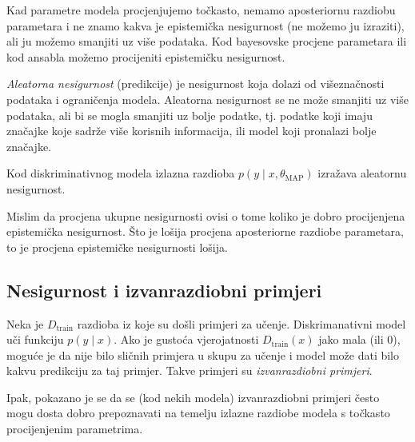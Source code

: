 \documentclass{article}
\begin{document}
Kad parametre modela procjenjujemo točkasto, nemamo aposteriornu razdiobu parametara i ne znamo kakva je epistemička nesigurnost (ne možemo ju izraziti), ali ju možemo smanjiti uz više podataka. Kod bayesovske procjene parametara ili kod ansabla možemo procijeniti epistemičku nesigurnost.

\emph{Aleatorna nesigurnost} (predikcije) je nesigurnost koja dolazi od višeznačnosti podataka i ograničenja modela. Aleatorna nesigurnost se ne može smanjiti uz više podataka, ali bi se mogla smanjiti uz bolje podatke, tj. podatke koji imaju značajke koje sadrže više korisnih informacija, ili model koji pronalazi bolje značajke.

Kod diskriminativnog modela izlazna razdioba $p(y\mid x, \theta_\text{MAP})$ izražava aleatornu nesigurnost.


Mislim da procjena ukupne nesigurnosti ovisi o tome koliko je dobro procijenjena epistemička nesigurnost. Što je lošija procjena aposteriorne razdiobe parametara, to je procjena epistemičke nesigurnosti lošija.


\subsection{Nesigurnost i izvanrazdiobni primjeri}

Neka je $D_{\text{train}}$ razdioba iz koje su došli primjeri za učenje. Diskrimanativni model uči funkciju $p(y\mid x)$. Ako je gustoća vjerojatnosti $D_{\text{train}}(x)$ jako mala (ili $0$), moguće je da nije bilo sličnih primjera u skupu za učenje i model može dati bilo kakvu predikciju za taj primjer. Takve primjeri su \emph{izvanrazdiobni primjeri}.

Ipak, pokazano je se da se (kod nekih modela) izvanrazdiobni primjeri često mogu dosta dobro prepoznavati na temelju izlazne razdiobe modela s točkasto procijenjenim parametrima. 
\end{document}
